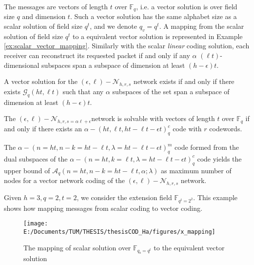 The messages are vectors of length $t$ over $\ensuremath{\mathbb{F}}_{q}$,
i.e. a vector solution is over field size $q$ and dimension $t$.
Such a vector solution has the same alphabet size as a scalar solution
of field size $q^{t}$, and we denote $q_{v}=q^{t}$. A mapping from
the scalar solution of field size $q^{t}$ to a equivalent vector
solution is represented in Example \ref{ex:scalar_vector_mapping}.
Similarly with the scalar \textit{linear} coding solution, each receiver
can reconstruct its requested packet if and only if any $\alpha$
$\left(\ell t\right)$-dimensional subspaces span a subspace of dimension
at least $\left(h-\epsilon\right)t$.
\begin{thm}
 A vector solution for the $(\epsilon,\ell)-\mathcal{N}_{h,r,s}$
network exists if and only if there exists $\mathcal{G}_{q}\left(ht,\ell t\right)$
such that any $\alpha$ subspaces of the set span a subspace of dimension
at least $\left(h-\epsilon\right)t$. 
\end{thm}
%
\begin{thm}
 The $(\epsilon,\ell)-\mathcal{N}_{h,r,s=\alpha\ell+\epsilon}$network
is solvable with vectors of length $t$ over $\ensuremath{\mathbb{F}}_{q}$
if and only if there exists an $\alpha-\left(ht,\ell t,ht-\ell t-\epsilon t\right)_{q}^{c}$
code with $r$ codewords. 
\end{thm}
\begin{cor}
The $\alpha-\left(n=ht,n-k=ht-\ell t,\lambda=ht-\ell t-\epsilon t\right)_{q}^{m}$
code formed from the dual subspaces of the $\alpha-\left(n=ht,k=\ell t,\lambda=ht-\ell t-\epsilon t\right)_{q}^{c}$
code yields the upper bound of $\mathcal{A}_{q}\left(n=ht,n-k=ht-\ell t,\alpha;\lambda\right)$
as maximum number of nodes for a vector network coding of the $(\epsilon,\ell)-\mathcal{N}_{h,r,s}$
network. \label{cor:dual_subspaces}
\end{cor}
\begin{example}
\label{ex:scalar_vector_mapping} 

Given $h=3,q=2,t=2$, we consider the extension field $\ensuremath{\mathbb{F}}_{q^{t}=2^{2}}$.
This example shows how mapping messages from scalar coding to vector
coding.
\end{example}
\begin{figure}[H]
\caption{The mapping of scalar solution over $\ensuremath{\mathbb{F}}_{q_{\mathrm{s}}=q^{t}}$
to the equivalent vector solution\label{fig:x_mapping}}

\centering{}\texttt{[image: E:/Documents/TUM/THESIS/thesisCOD\_Ha/figures/x\_mapping]}
\end{figure}

